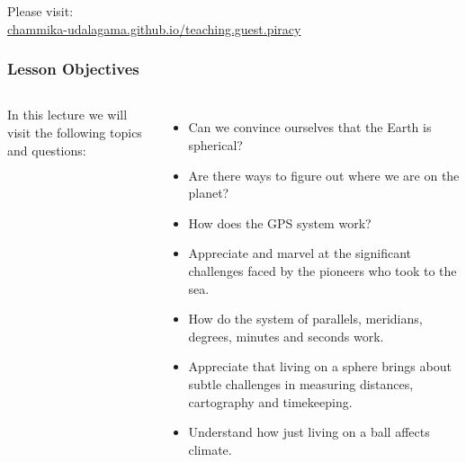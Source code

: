 {
\begin{frame}
\maketitle

\begin{center}
	\small Please visit:\\
	\href{https://chammika-udalagama.github.io/teaching.guest.piracy/}{chammika-udalagama.github.io/teaching.guest.piracy}
\end{center}
\end{frame}
}
\begin{frame}
\frametitle{Lesson Objectives}
\begin{columns}
	In this lecture we will visit the following topics and questions:
	\begin{itemize}
		\item Can we convince ourselves that the Earth is spherical?
		\item Are there ways to figure out where we are on the planet?
		\item How does the GPS system work?
		\item Appreciate and marvel at the significant challenges faced by the pioneers who took to the sea.
		\item How do the system of parallels, meridians, degrees, minutes and seconds work.
		\item Appreciate that living on a sphere brings about subtle challenges in measuring distances, cartography and timekeeping.
		\item Understand how just living on a ball affects climate.
	\end{itemize}
\end{columns}
\end{frame}

